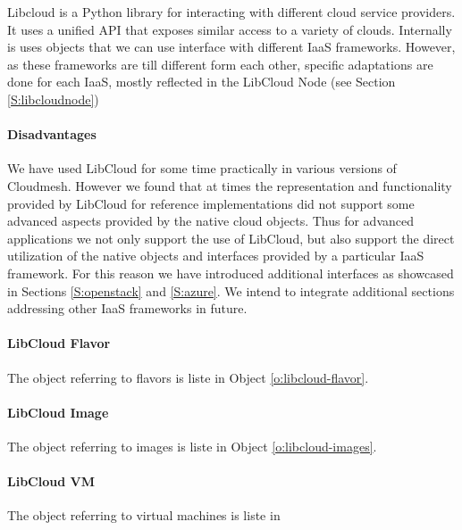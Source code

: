 \documentclass[10pt]{article}
\begin{document}
Libcloud is a Python library for interacting with different cloud
service providers. It uses a unified API that exposes similar access
to a variety of clouds. Internally is uses objects that we can use
interface with different IaaS frameworks. However, as these frameworks
are till different form each other, specific adaptations are done for
each IaaS, mostly reflected in the LibCloud Node (see Section
\ref{S:libcloudnode})

\paragraph{Disadvantages}

We have used LibCloud for some time practically in various versions of
Cloudmesh. However we found that at times the representation and
functionality provided by LibCloud for reference implementations did
not support some advanced aspects provided by the native cloud
objects. Thus for advanced applications we not only support the use of
LibCloud, but also support the direct utilization of the native
objects and interfaces provided by a particular IaaS framework. For
this reason we have introduced additional interfaces as showcased in
Sections \ref{S:openstack} and \ref{S:azure}.  We intend to integrate
additional sections addressing other IaaS frameworks in future.

\paragraph{LibCloud Flavor}

The object referring to flavors is liste in Object \ref{o:libcloud-flavor}.


\paragraph{LibCloud Image}

The object referring to images is liste in Object
\ref{o:libcloud-images}.



\paragraph{LibCloud VM}


The object referring to virtual machines is liste in 
\end{document}
